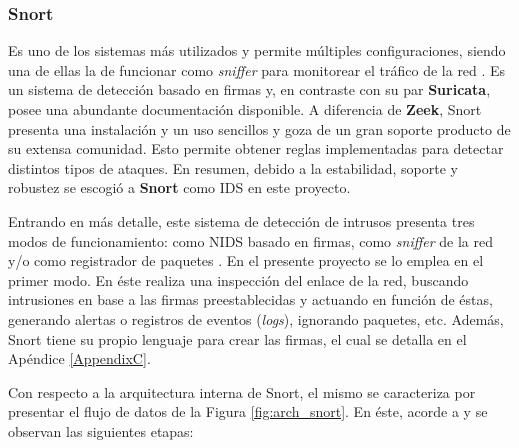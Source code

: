 \subsubsection*{Snort}
Es uno de los sistemas más utilizados y permite múltiples configuraciones,
siendo una de ellas la de funcionar como \textit{sniffer} para monitorear el
tráfico de la red \parencite{sniffer}. Es un sistema de detección basado en
firmas y, en contraste con su par \textbf{Suricata}, posee una abundante
documentación disponible. A diferencia de \textbf{Zeek}, Snort presenta una
instalación y un uso sencillos y goza de un gran soporte producto de su extensa
comunidad. Esto permite obtener reglas implementadas para detectar distintos
tipos de ataques. En resumen, debido a la estabilidad, soporte y robustez se
escogió a \textbf{Snort} como IDS en este proyecto.

Entrando en más detalle, este sistema de detección de intrusos presenta tres
modos de funcionamiento: como NIDS basado en firmas, como \textit{sniffer} de la
red y/o como registrador de paquetes \parencite{snort_manual}. En el presente
proyecto se lo emplea en el primer modo. En éste realiza una inspección del
enlace de la red, buscando intrusiones en base a las firmas preestablecidas y
actuando en función de éstas, generando alertas o registros de eventos
(\textit{logs}), ignorando paquetes, etc. Además, Snort tiene su propio lenguaje
para crear las firmas, el cual se detalla en el Apéndice \ref{AppendixC}.

Con respecto a la arquitectura interna de Snort, el mismo se caracteriza por
presentar el flujo de datos de la Figura \ref{fig:arch_snort}. En éste, acorde a
\parencite{ids_w_snort} y \parencite{pos_sec_sis} se observan las siguientes
etapas:

